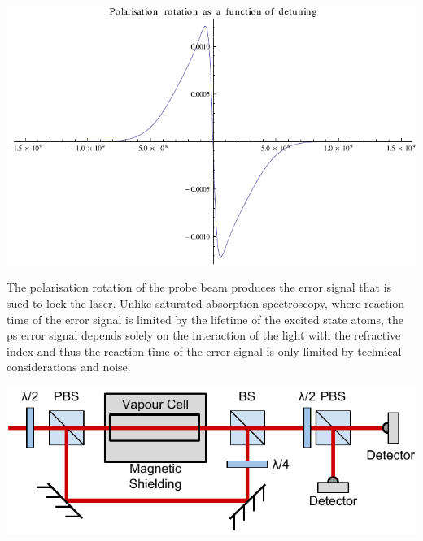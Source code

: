 \documentclass{article}
\newenvironment{Figure}
  {\par\medskip\noindent\minipage{\linewidth}}
  {\endminipage\par\medskip}
\begin{document}
\begin{multicols}{2}
\begin{Figure}
    \centering
    \captionsetup{type=figure}
    \includegraphics[width=0.75\linewidth]{Figs/dispersion.pdf}
    \label{dispersion}
\end{Figure}

The polarisation rotation of the probe beam produces the error signal that is sued to lock the laser. Unlike saturated absorption spectroscopy, where reaction time of the error signal is limited by the lifetime of the excited state atoms, the \gls{ps} error signal depends solely on the interaction of the light with the refractive index and thus the reaction time of the error signal is only limited by technical considerations and noise.

\begin{Figure}
    \centering
    \captionsetup{type=figure}
    \includegraphics[width=\linewidth]{Figs/PolSpec.pdf}
    \label{polspec_schematic}
\end{Figure}


\end{multicols}
\end{document}
